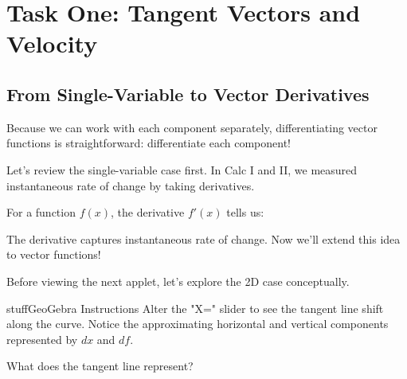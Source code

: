 \documentclass{ximera}
\begin{document}
\section*{Task One: Tangent Vectors and Velocity}

\subsection*{From Single-Variable to Vector Derivatives}

Because we can work with each component separately, differentiating vector functions is straightforward: differentiate each component!

\begin{problem}
Let's review the single-variable case first. In Calc I and II, we measured instantaneous rate of change by taking derivatives.

For a function $f(x)$, the derivative $f'(x)$ tells us:
\begin{selectAll}
\end{selectAll}

\begin{feedback}
The derivative captures instantaneous rate of change. Now we'll extend this idea to vector functions!
\end{feedback}
\end{problem}

\begin{problem}
Before viewing the next applet, let's explore the 2D case conceptually.

\begin{expandable}{stuff}{GeoGebra Instructions}
    Alter the "X=" slider to see the tangent line shift along the curve. Notice the approximating horizontal and vertical components represented by $dx$ and $df$.
\end{expandable}

\begin{center}
\end{center}

What does the tangent line represent?
\begin{multipleChoice}
\end{multipleChoice}
\end{problem}
\end{document}
